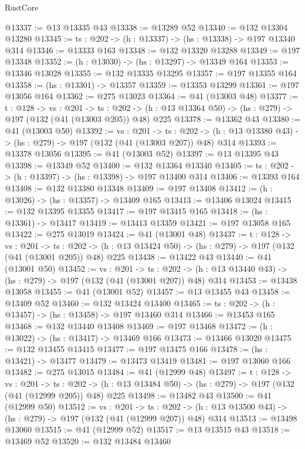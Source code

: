 \begin{lexlean}{RustCore}
\begin{coremodule}
@13337 := @13 @13335 @43
@13338 := @13289 @52
@13340 := @132 @13304 @13280
@13345 := {ts : @202} -> (h : @13337) -> (hs : @13338) -> @197 @13340 @314
@13346 := @13333 @163
@13348 := @132 @13320 @13288
@13349 := @197 @13348
@13352 := (h : @13030) -> (hs : @13297) -> @13349 @164
@13353 := @13346 @13028
@13355 := @132 @13335 @13295
@13357 := @197 @13355 @164
@13358 := (hs : @13301) -> @13357
@13359 := @13353 @13299
@13361 := @197 @13056 @164
@13362 := @275 @13023
@13364 := @41 (@13003 @48)
@13377 := {t : @128} ->
  {vs : @201} ->
  {ts : @202} -> (h : @13 @13364 @50) -> (hs : @279) -> @197 (@132 (@41 (@13003 @205)) @48) @225
@13378 := @13362 @43
@13380 := @41 (@13003 @50)
@13392 := {vs : @201} ->
  {ts : @202} -> (h : @13 @13380 @43) -> (hs : @279) -> @197 (@132 (@41 (@13003 @207)) @48) @314
@13393 := @13378 @13056
@13395 := @41 (@13003 @52)
@13397 := @13 @13395 @43
@13398 := @13349 @52
@13400 := @132 @13364 @13340
@13405 := {ts : @202} -> (h : @13397) -> (hs : @13398) -> @197 @13400 @314
@13406 := @13393 @164
@13408 := @132 @13380 @13348
@13409 := @197 @13408
@13412 := (h : @13026) -> (hs : @13357) -> @13409 @165
@13413 := @13406 @13024
@13415 := @132 @13395 @13355
@13417 := @197 @13415 @165
@13418 := (hs : @13361) -> @13417
@13419 := @13413 @13359
@13421 := @197 @13058 @165
@13422 := @275 @13019
@13424 := @41 (@13001 @48)
@13437 := {t : @128} ->
  {vs : @201} ->
  {ts : @202} -> (h : @13 @13424 @50) -> (hs : @279) -> @197 (@132 (@41 (@13001 @205)) @48) @225
@13438 := @13422 @43
@13440 := @41 (@13001 @50)
@13452 := {vs : @201} ->
  {ts : @202} -> (h : @13 @13440 @43) -> (hs : @279) -> @197 (@132 (@41 (@13001 @207)) @48) @314
@13453 := @13438 @13058
@13455 := @41 (@13001 @52)
@13457 := @13 @13455 @43
@13458 := @13409 @52
@13460 := @132 @13424 @13400
@13465 := {ts : @202} -> (h : @13457) -> (hs : @13458) -> @197 @13460 @314
@13466 := @13453 @165
@13468 := @132 @13440 @13408
@13469 := @197 @13468
@13472 := (h : @13022) -> (hs : @13417) -> @13469 @166
@13473 := @13466 @13020
@13475 := @132 @13455 @13415
@13477 := @197 @13475 @166
@13478 := (hs : @13421) -> @13477
@13479 := @13473 @13419
@13481 := @197 @13060 @166
@13482 := @275 @13015
@13484 := @41 (@12999 @48)
@13497 := {t : @128} ->
  {vs : @201} ->
  {ts : @202} -> (h : @13 @13484 @50) -> (hs : @279) -> @197 (@132 (@41 (@12999 @205)) @48) @225
@13498 := @13482 @43
@13500 := @41 (@12999 @50)
@13512 := {vs : @201} ->
  {ts : @202} -> (h : @13 @13500 @43) -> (hs : @279) -> @197 (@132 (@41 (@12999 @207)) @48) @314
@13513 := @13498 @13060
@13515 := @41 (@12999 @52)
@13517 := @13 @13515 @43
@13518 := @13469 @52
@13520 := @132 @13484 @13460

\end{coremodule}
\end{lexlean}
